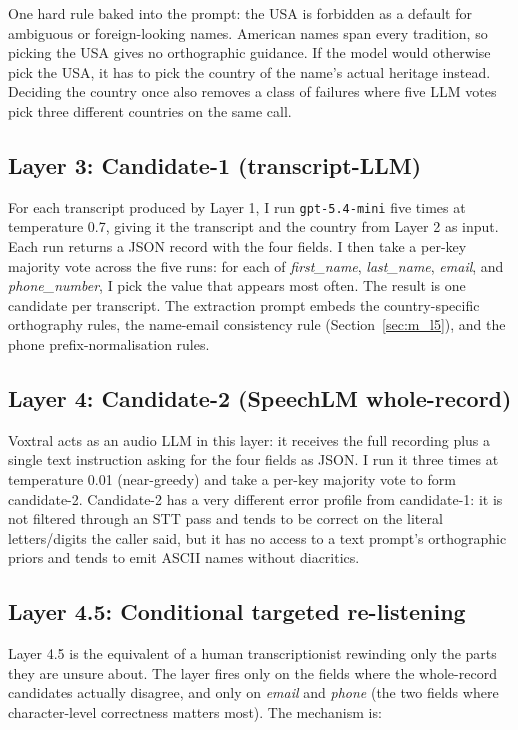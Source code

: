 \documentclass[11pt,a4paper]{article}
\begin{document}
One hard rule baked into the prompt: the USA is forbidden as a
default for ambiguous or foreign-looking names. American names span
every tradition, so picking the USA gives no orthographic guidance.
If the model would otherwise pick the USA, it has to pick the
country of the name's actual heritage instead. Deciding the country
once also removes a class of failures where five LLM votes pick
three different countries on the same call.

\subsection{Layer 3: Candidate-1 (transcript-LLM)}\label{sec:m_l3}

For each transcript produced by Layer 1, I run \verb|gpt-5.4-mini|
five times at temperature 0.7, giving it the transcript and the
country from Layer 2 as input. Each run returns a JSON record with
the four fields. I then take a per-key majority vote across the five
runs: for each of \textit{first\_name}, \textit{last\_name},
\textit{email}, and \textit{phone\_number}, I pick the value that
appears most often. The result is one candidate per transcript.
The extraction prompt embeds the country-specific orthography rules,
the name-email consistency rule (Section~\ref{sec:m_l5}), and the
phone prefix-normalisation rules.

\subsection{Layer 4: Candidate-2 (SpeechLM whole-record)}\label{sec:m_l4}

Voxtral acts as an audio LLM in this layer: it receives the full
recording plus a single text instruction asking for the four fields
as JSON. I run it three times at temperature 0.01 (near-greedy) and
take a per-key majority vote to form candidate-2. Candidate-2 has a
very different error profile from candidate-1: it is not filtered
through an STT pass and tends to be correct on the literal
letters/digits the caller said, but it has no access to a text
prompt's orthographic priors and tends to emit ASCII names without
diacritics.

\subsection{Layer 4.5: Conditional targeted re-listening}\label{sec:m_l45}

Layer 4.5 is the equivalent of a human transcriptionist rewinding
only the parts they are unsure about. The layer fires only on the
fields where the whole-record candidates actually disagree, and only
on \textit{email} and \textit{phone} (the two fields where
character-level correctness matters most). The mechanism is:
\end{document}
